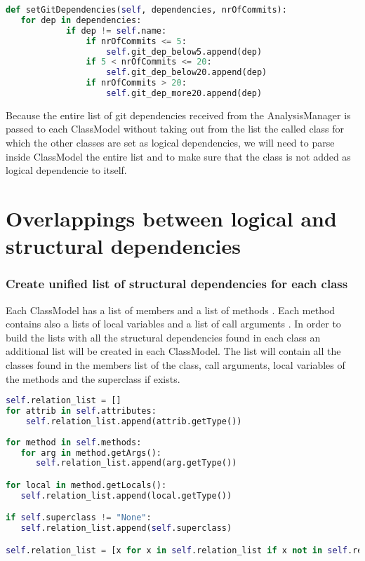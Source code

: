 \begin{lstlisting}[language=python, caption={Split dependencies in categories.}]
def setGitDependencies(self, dependencies, nrOfCommits):
   for dep in dependencies:
            if dep != self.name:
                if nrOfCommits <= 5:
                    self.git_dep_below5.append(dep)
                if 5 < nrOfCommits <= 20:
                    self.git_dep_below20.append(dep)
                if nrOfCommits > 20:
                    self.git_dep_more20.append(dep)
\end{lstlisting}

Because the entire list of git dependencies received from the AnalysisManager is passed to each ClassModel without taking out from the list the called class for which the other classes are set as logical dependencies, we will need to parse inside ClassModel the entire list and to make sure that the class is not added as logical dependencie to itself.

\section{Overlappings between logical and structural dependencies}

\subsubsection{Create unified list of structural dependencies for each class}
\tab Each ClassModel has a list of members and a list of methods . Each method contains also a lists of local variables and a list of call arguments . In order to build the lists with all the structural dependencies found in each class an additional list will be created in each ClassModel. The list will contain all the classes found in the members list of the class, call arguments, local variables of the methods and the superclass if exists.

\begin{lstlisting}[language=python, caption={Create unified list of structural dependencies.}]
self.relation_list = []
for attrib in self.attributes:
    self.relation_list.append(attrib.getType())
            
for method in self.methods:
   for arg in method.getArgs():
      self.relation_list.append(arg.getType())

for local in method.getLocals():
   self.relation_list.append(local.getType())

if self.superclass != "None":
   self.relation_list.append(self.superclass)

self.relation_list = [x for x in self.relation_list if x not in self.relation_list]
\end{lstlisting}

